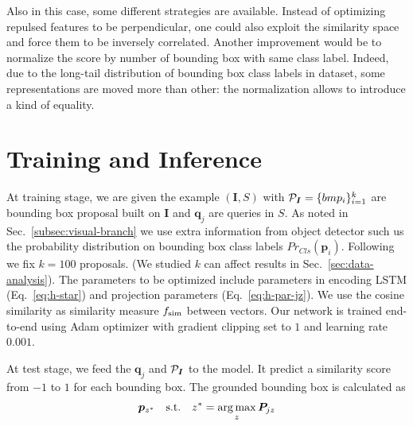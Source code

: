 Also in this case, some different strategies are available. Instead of
optimizing repulsed features to be perpendicular, one could also
exploit the similarity space and force them to be inversely
correlated. Another improvement would be to normalize the score by
number of bounding box with same class label. Indeed, due to the
long-tail distribution of bounding box class labels in dataset, some
representations are moved more than other: the normalization allows to
introduce a kind of equality.

\section{Training and Inference}
\label{sec:training-and-inference}

At training stage, we are given the example $(\bm{I}, S)$ with
$\mathcal{P}_{\bm{I}} = \{ bm{p}_i \}^k_{i=1}$ are bounding box proposal
built on $\bm{I}$ and $\bm{q}_j$ are queries in $S$. As noted in
Sec.~\ref{subsec:visual-branch} we use extra information from object
detector such us the probability distribution on bounding box class
labels $Pr_{Cls}(\bm{p}_i)$. Following \cite{chen2018knowledge} we fix
$k = 100$ proposals. (We studied $k$ can affect results in
Sec.~\ref{sec:data-analysis}). The parameters to be optimized include
parameters in encoding LSTM (Eq.~\ref{eq:h-star}) and projection
parameters (Eq.~\ref{eq:h-par-jz}). We use the cosine similarity as
similarity measure $f_{\text{sim}}$ between vectors. Our network is trained
end-to-end using Adam optimizer with gradient clipping set to $1$ and
learning rate $0.001$.

At test stage, we feed the $\bm{q}_j$ and $\mathcal{P}_{\bm{I}}$ to the model. It predict a similarity score from $-1$ to $1$ for each bounding box. The grounded bounding box is calculated as
\begin{equation}
  \bm{p}_{z^*} \quad \text{s.t.} \quad z^* = \operatorname*{arg\,max}_z \bm{P}_{jz}
\end{equation}